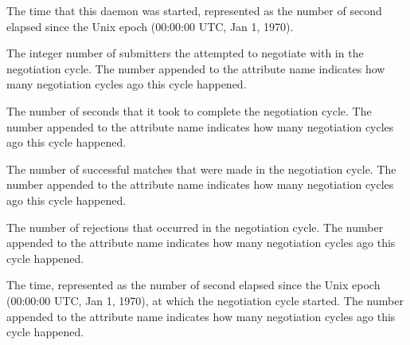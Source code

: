 \begin{description}

\item[\AdAttr{DaemonStartTime}:] The time that this daemon was
  started, represented as the number of second elapsed since
    the Unix epoch (00:00:00 UTC, Jan 1, 1970).


\label{attr:LastNegotiationCycleActiveSubmitterCount<X>}
\item[\AdAttr{LastNegotiationCycleActiveSubmitterCount<X>}:] The integer
  number of submitters
  the  attempted to negotiate with in the negotiation cycle.
  The number  appended to the attribute name indicates how
  many negotiation cycles ago this cycle happened.

\item[\AdAttr{LastNegotiationCycleDuration<X>}:] The number of seconds
  that it took to complete the negotiation cycle.  The number 
  appended to the attribute name indicates how many negotiation cycles
  ago this cycle happened.

\item[\AdAttr{LastNegotiationCycleMatches<X>}:] The number of successful
  matches that were made in the negotiation cycle.  The number 
  appended to the attribute name indicates how many negotiation cycles
  ago this cycle happened.

\item[\AdAttr{LastNegotiationCycleDuration<X>}:] The number of
  rejections that occurred in the negotiation cycle.  The number 
  appended to the attribute name indicates how many negotiation cycles
  ago this cycle happened.

\item[\AdAttr{LastNegotiationCycleStartTime<X>}:]
  The time, represented as the number of second elapsed since the Unix
  epoch (00:00:00 UTC, Jan 1, 1970), at which the negotiation cycle
  started.  The number  appended to the attribute name
  indicates how many negotiation cycles ago this cycle happened.


\end{description}
